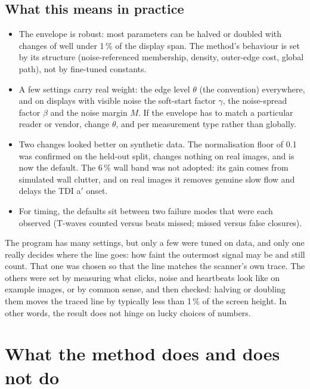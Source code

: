 \documentclass[11pt,a4paper]{article}
\begin{document}
\subsection{What this means in practice}
\begin{itemize}
\item The envelope is robust: most parameters can be halved or doubled with changes of well under 1\,\% of the display
span. The method's behaviour is set by its structure (noise-referenced membership, density, outer-edge cost, global
path), not by fine-tuned constants.
\item A few settings carry real weight: the edge level $\theta$ (the convention) everywhere, and on displays with
visible noise the soft-start factor $\gamma$, the noise-spread factor $\beta$ and the noise margin $M$. If the envelope has to match a particular reader or vendor, change
$\theta$, and per measurement type rather than globally.
\item Two changes looked better on synthetic data. The normalisation floor of 0.1 was confirmed on the held-out
split, changes nothing on real images, and is now the default. The 6\,\% wall band was not adopted: its gain comes
from simulated wall clutter, and on real images it removes genuine slow flow and delays the TDI a$'$ onset.
\item For timing, the defaults sit between two failure modes that were each observed (T-waves counted versus beats
missed; missed versus false closures).
\end{itemize}

\begin{plainbox}
The program has many settings, but only a few were tuned on data, and only one really decides where the line goes:
how faint the outermost signal may be and still count. That one was chosen so that the line matches the scanner's own
trace. The others were set by measuring what clicks, noise and heartbeats look like on example images, or by common
sense, and then checked: halving or doubling them moves the traced line by typically less than 1\,\% of the screen
height. In other words, the result does not hinge on lucky choices of numbers.
\end{plainbox}

\section{What the method does and does not do}
\label{sec:convention}
\end{document}
